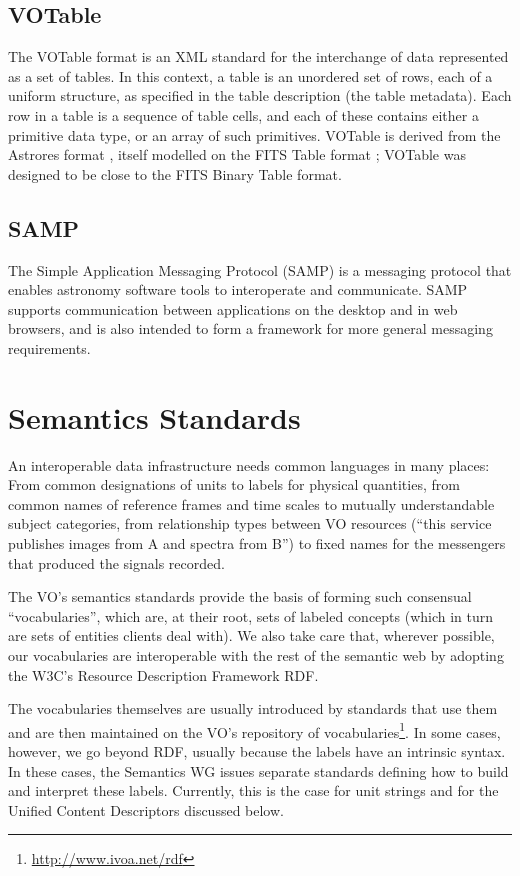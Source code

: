 \documentclass[11pt,letter]{ivoa}
\begin{document}
\subsection{VOTable} 

The VOTable \citep{2019ivoa.spec.1021O} format is an XML standard for
the interchange of data represented as a set of tables.
In this context, a table is an unordered set of rows, each of a uniform
structure, as specified
in the table description (the table metadata). Each row in a table is a
sequence of table cells,
and each of these contains either a primitive data type, or an array of
such primitives. VOTable
is derived from the Astrores format \citep{astrores}, itself modelled on
the FITS Table format
\citep{std:FITS}; VOTable was designed to be close to the FITS Binary
Table format.

\subsection{SAMP}

The Simple Application Messaging Protocol (SAMP)
\citep{2010ivoa.spec.1216B} is a messaging protocol that enables
astronomy
software tools to interoperate and communicate. SAMP supports
communication between
applications on the desktop and in web browsers, and is also intended to
form a framework
for more general messaging requirements. 

\section{Semantics Standards}

An interoperable data infrastructure needs common languages in many
places: From common designations of units to labels for physical
quantities, from common names of reference frames and time scales to
mutually understandable subject categories, from relationship types
between VO resources
(``this service publishes images from A and spectra from B'') to fixed names
for the messengers that produced the signals recorded.

The VO's semantics standards provide the basis of forming such
consensual ``vocabularies'', which are, at their root, sets of labeled
concepts (which in turn are sets of entities clients deal with).  We
also take care that, wherever possible, our vocabularies are
interoperable with the rest of the semantic web by adopting the W3C's
Resource Description Framework RDF.

The vocabularies themselves are usually introduced by standards that use
them and are then maintained on the VO's repository of
vocabularies\footnote{\url{http://www.ivoa.net/rdf}}.  In some cases,
however, we go beyond RDF, usually because the labels have an intrinsic
syntax.  In these cases, the Semantics WG issues separate standards
defining how to build and interpret these labels.  Currently, this is
the case for unit strings and for the Unified Content Descriptors
discussed below.
\end{document}
